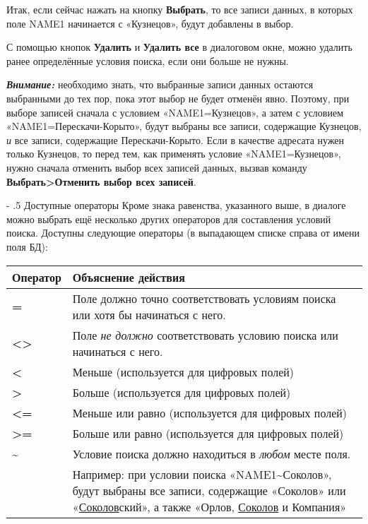 ﻿\documentclass[a4paper,10pt]{article}
\makeatletter
\renewcommand\paragraph{%
   \@startsection{paragraph}{4}{0mm}%
      {-\baselineskip}%
      {.5\baselineskip}%
      {\normalfont\normalsize\bfseries}}
\makeatother
\begin{document}
Итак, если сейчас нажать на кнопку \textbf{Выбрать}, то все записи данных, в которых поле NAME1 начинается с «Кузнецов», будут добавлены в выбор.

С помощью кнопок \textbf{Удалить} и \textbf{Удалить все} в диалоговом окне, можно удалить ранее определённые условия поиска, если они больше не нужны.

\begin{mdframed}[backgroundcolor=blue!10]
\textbf{\textit{Внимание:}} необходимо знать, что выбранные записи данных остаются выбранными до тех пор, пока этот выбор не будет отменён явно. Поэтому, при выборе записей сначала с условием «NAME1=Кузнецов», а затем с условием «NAME1=Перескачи-Корыто», будут выбраны все записи, содержащие Кузнецов, \textit{и} все записи, содержащие Перескачи-Корыто. Если в качестве адресата нужен только Кузнецов, то перед тем, как применять условие «NAME1=Кузнецов», нужно сначала отменить выбор всех записей данных, вызвав команду \textbf{Выбрать>Отменить выбор всех записей}.
\end{mdframed}

\paragraph{Доступные операторы}
Кроме знака равенства, указанного выше,  в диалоге можно выбрать ещё несколько других операторов для составления условий поиска. Доступны следующие операторы (в выпадающем списке справа от имени поля БД):

\begin{center}
\begin{tabular}{  m{4cm}  m{12cm}  }
 \textbf{Оператор} & \textbf{Объяснение действия}\\ 
 \hline
  \textbf{=} & Поле должно точно соответствовать условиям поиска или хотя бы начинаться с него.\\
  \textbf{<>} & Поле \textit{не должно} соответствовать условию поиска или начинаться с него.\\ 
\textbf{<} & Меньше (используется для цифровых полей)\\
\textbf{>} & Больше (используется для цифровых полей)\\
\textbf{<=} & Меньше или равно (используется для цифровых полей)\\
\textbf{>=} & Больше или равно (используется для цифровых полей)\\
\textbf{\textasciitilde} & Условие поиска должно находиться в \textit{любом} месте поля.\\
 & Например: при условии поиска «NAME1\textasciitilde Соколов», будут выбраны все записи, содержащие «Соколов» или «\underline{Соколов}ский», а также «Орлов, \underline{Соколов} и Компания»\\
\end{tabular}
\end{center}
\newpage
\end{document}
